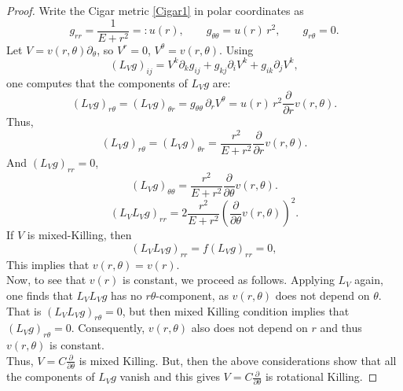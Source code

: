 \documentclass[10pt,a4paper]{amsart}
\begin{document}
\begin{proof}
Write the Cigar metric   \eqref{Cigar1}   in polar coordinates as
\[
g_{rr}=\frac{1}{E+r^2}=:u(r),\qquad g_{\theta\theta}=u(r)\,r^2,\qquad g_{r\theta}=0.
\]
Let $V=v(r, \theta)\partial_\theta$, so $V^r=0$, $V^\theta=v(r, \theta)$. Using 
$$(L_V g)_{ij}=V^k\partial_k g_{ij}+g_{kj}\partial_i V^k+g_{ik}\partial_j V^k,$$ one computes that the  components of $L_V g$ are:
\[
(L_V g)_{r\theta}=(L_V g)_{\theta r}=g_{\theta\theta}\,\partial_r V^\theta
= u(r)\,r^2   \frac{{\partial}}{{\partial r}} v(r, \theta).
\]
Thus, 
$$  (L_V g)_{r\theta}=(L_V g)_{\theta r}  =  \frac{r^2}{E+r^2}   \frac{{\partial}}{{\partial r}} v(r, \theta).$$
And $(L_V g)_{rr}= 0$,
\[
(L_V g)_{\theta\theta} = \frac{r^2}{E+r^2}   \frac{{\partial}}{{\partial \theta}} v(r, \theta).\]
$$(L_VL_Vg)_{rr}= 2 \frac{r^2}{E+r^2}   (\frac{{\partial}}{{\partial \theta}} v(r, \theta))^2.$$
If $V$ is  mixed-Killing, then 
$$  (L_VL_Vg)_{rr} =  f (L_V g)_{rr}= 0,$$
 This implies that $v(r, \theta) = v(r).$\\
Now, to see that $v(r)$ is constant, we proceed as follows.  
Applying $L_V$ again, one finds that $L_VL_Vg$ has no $r\theta$-component,
as $v(r, \theta)$ does not depend on $\theta$. That is
$(L_VL_Vg)_{r \theta} = 0$, but then mixed Killing condition implies that 
 $(L_V g)_{r\theta} = 0$. Consequently, $v(r, \theta)$ also does not depend 
 on $r$ and thus $v(r, \theta)$ is constant.  \\
 Thus, $V =  C  \frac{{\partial}}{{\partial \theta}}$  is mixed Killing.
 But, then the above considerations show that all the components of  $L_V g$  
 vanish and this gives $V =  C  \frac{{\partial}}{{\partial \theta}}$
 is rotational Killing.
\end{proof}
\end{document}
